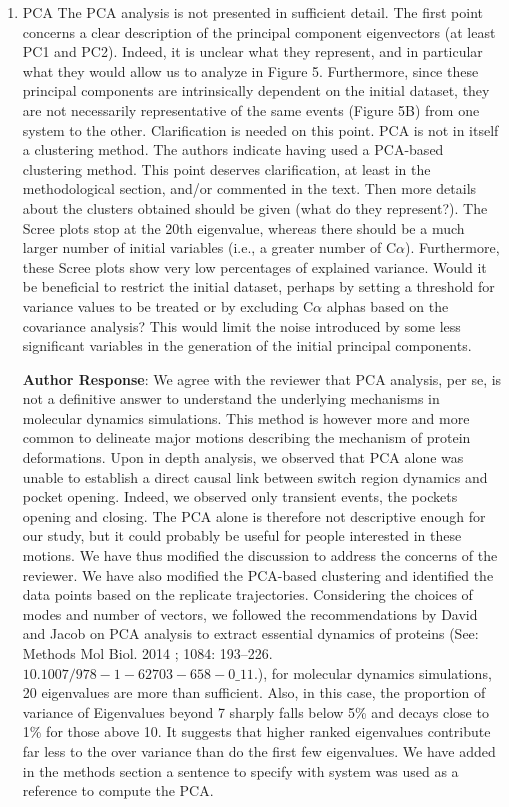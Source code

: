 \documentclass[11pt, a4paper]{article}
\begin{document}
\begin{enumerate}
    \item PCA
    The PCA analysis is not presented in sufficient detail. The first point concerns a clear description of the principal component eigenvectors (at least PC1 and PC2). Indeed, it is unclear what they represent, and in particular what they would allow us to analyze in Figure 5. Furthermore, since these principal components are intrinsically dependent on the initial dataset, they are not necessarily representative of the same events (Figure 5B) from one system to the other. Clarification is needed on this point.
    PCA is not in itself a clustering method. The authors indicate having used a PCA-based clustering method. This point deserves clarification, at least in the methodological section, and/or commented in the text. Then more details about the clusters obtained should be given (what do they represent?).
    The Scree plots stop at the 20th eigenvalue, whereas there should be a much larger number of initial variables (i.e., a greater number of C$\alpha$). Furthermore, these Scree plots show very low percentages of explained variance. Would it be beneficial to restrict the initial dataset, perhaps by setting a threshold for variance values to be treated or by excluding C$\alpha$ alphas based on the covariance analysis? This would limit the noise introduced by some less significant variables in the generation of the initial principal components.
 
\textbf{Author Response}: We agree with the reviewer that PCA analysis, per se, is not a definitive answer to understand the underlying mechanisms in molecular dynamics simulations. This method is however more and more common to delineate major motions describing the mechanism of protein deformations. Upon in depth analysis, we observed that PCA alone was unable to establish a direct causal link between switch region dynamics and pocket opening. Indeed, we observed only transient events, the pockets opening and closing. The PCA alone is therefore not descriptive enough for our study, but it could probably be useful for people interested in these motions. We have thus modified the discussion to address the concerns of the reviewer. We have also modified the PCA-based clustering and identified the data points based on the replicate trajectories. 
Considering the choices of modes and number of vectors, we followed the recommendations by David and Jacob on PCA analysis to extract essential dynamics of proteins (See: Methods Mol Biol. 2014 ; 1084: 193–226. $10.1007/978-1-62703-658-0\_11$.), for molecular dynamics simulations, 20 eigenvalues are more than sufficient. Also, in this case, the proportion of variance of Eigenvalues beyond 7 sharply falls below 5\% and decays close to 1\% for those above 10. It suggests that higher ranked eigenvalues contribute far less to the over variance than do the first few eigenvalues. We have added in the methods section a sentence to specify with system was used as a reference to compute the PCA.

\end{enumerate}
\end{document}
